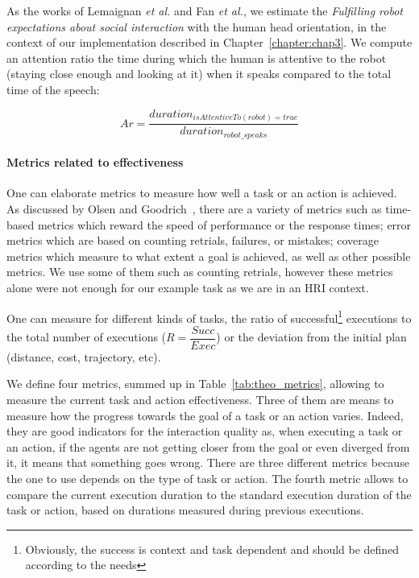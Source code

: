 \documentclass[a4paper,11pt,twoside]{StyleThese}
\begin{document}
As the works of Lemaignan \textit{et al.} and Fan \textit{et al.}, we estimate the \textit{Fulfilling robot expectations about social interaction} with the human head orientation, in the context of our implementation described in Chapter~\ref{chapter:chap3}. We compute an attention ratio \ie the time during which the human is attentive to the robot (\ie staying close enough and looking at it) when it speaks compared to the total time of the speech:

\begin{equation}\label{eq:attention_r}
Ar = \frac{duration_{isAttentiveTo(robot)=true}}{duration_{robot\_speaks}}
\end{equation}

\paragraph{Metrics related to effectiveness}\label{subsec:task_eff}
One can elaborate metrics to measure how well a task or an action is achieved. As discussed by Olsen and Goodrich~\cite{olsen_2003_metrics}, there are a variety of metrics such as time-based metrics which reward the speed of performance or the response times; error metrics which are based on counting retrials, failures, or mistakes; coverage metrics which measure to what extent a goal is achieved, as well as other possible metrics. We use some of them such as counting retrials, however these metrics alone were not enough for our example task as we are in an HRI context.

One can measure for different kinds of tasks, the ratio of successful\footnote{Obviously, the success is context and task dependent and should be defined according to the needs} executions to the total number of executions (\eg $R=\dfrac{Succ}{Exec}$) or the deviation from the initial plan (distance, cost, trajectory, etc). 

We define four metrics, summed up in Table~\ref{tab:theo_metrics}, allowing to measure the current task and action effectiveness. Three of them are means to measure how the progress towards the goal of a task or an action varies. Indeed, they are good indicators for the interaction quality as, when executing a task or an action, if the agents are not getting closer from the goal or even diverged from it, it means that something goes wrong. There are three different metrics because the one to use depends on the type of task or action. The fourth metric allows to compare the current execution duration to the standard execution duration of the task or action, based on durations measured during previous executions.
\end{document}
